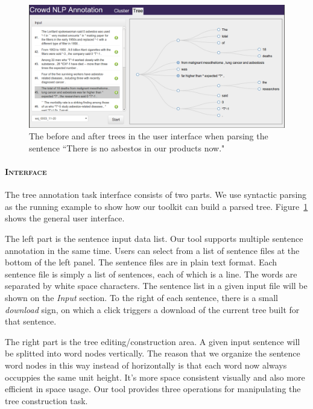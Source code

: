 \begin{figure}
\centering
\includegraphics[width=6.1in]{figs/interface-tree.png}
\caption{The before and after trees in the user interface when parsing
the sentence {``There is no asbestos in our products now."}}
\label{fig:interface_tree.png}
\end{figure}


\paragraph{\textsc{Interface}\\} The tree annotation task interface
consists of two parts.  We use syntactic parsing as the running
example to show how our toolkit can build a parsed tree.
Figure~\ref{fig:interface_tree.png} shows the general user interface. 

The left part is the sentence input data list. Our tool supports
multiple sentence annotation in the same time. Users can select from a
list of sentence files at the bottom of the left panel. The sentence
files are in plain text format. Each sentence file is simply a list of
sentences, each of which is a line. The words are separated by white
space characters. The sentence list in a given input file will be
shown on the \textit{Input} section. To the right of each sentence,
there is a small \textit{download} sign, on which a click triggers a
download of the current tree built for that sentence.


The right part is the tree editing/construction area. A given input
sentence will be splitted into word nodes vertically. The reason that
we organize the sentence word nodes in this way instead of
horizontally is that each word now always occuppies the same unit
height. It's more space consistent visually and also more efficient in
space usage. Our tool provides three operations for manipulating the
tree construction task.



